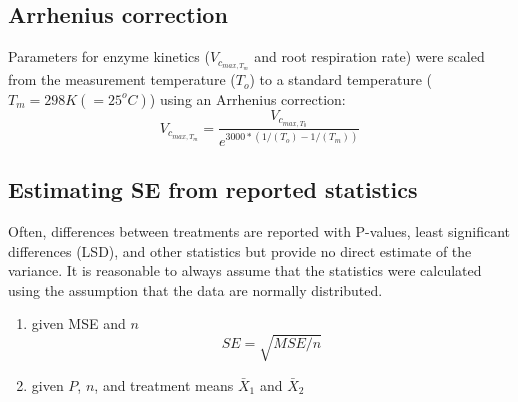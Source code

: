 \documentclass[12pt]{article}
\begin{document}
\begin{flushleft}
\begin{spacing}{1}


\subsection*{Arrhenius correction}\label{app:arrhenius}
 Parameters for enzyme kinetics ($V_{c_{max,T_m}}$ and root respiration rate) were scaled from the measurement temperature ($T_o$) to a standard temperature ($T_m=298 K (= 25^oC)$) using an Arrhenius correction:
$$V_{c_{max,T_m}}=\frac{V_{c_{max,T_0}}}{e^{3000*(1/(T_o)-1/(T_m))}}$$  

\subsection*{Estimating SE from reported statistics}\label{app:seest}

Often, differences between treatments are reported with P-values, least significant differences (LSD), and other statistics but provide no direct estimate of the variance.
It is reasonable to always assume that the statistics were calculated using the assumption that the data are normally distributed.

\begin{enumerate}
\item given MSE and $n$
 $$SE=\sqrt{MSE/n}$$
\item given $P$, $n$, and treatment means $\bar X_1$ and $\bar X_2$


\end{enumerate}
\end{spacing}
\end{flushleft}
\end{document}
